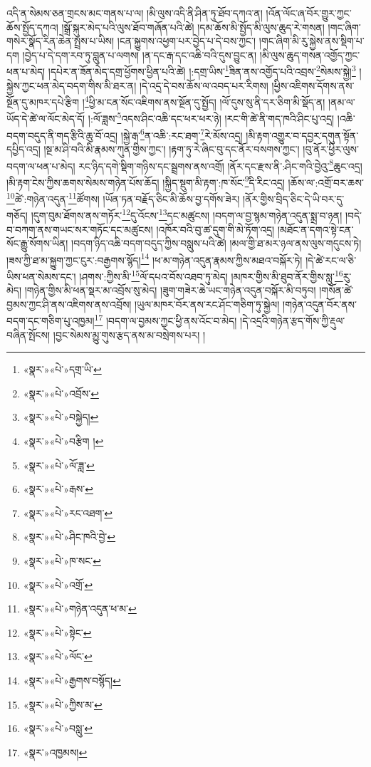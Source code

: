 འདི་ན་སེམས་ཅན་གྲངས་མང་གནས་པ་ལ། །མི་ལུས་འདི་ནི་ཤིན་ཏུ་ཐོབ་དཀའ་ན། །འོན་ལོང་ཞ་བོར་གྱུར་ཀྱང་ཆོས་སྤྱོད་དཀའ། །སྒྲོ་སྐུར་མེད་པའི་ལུས་ཐོབ་གཞོན་པའི་ཚེ། །དམ་ཆོས་མི་སྤྱོད་མི་ལུས་ཆུད་རེ་གསན། །གང་ཞིག་གསེར་སྣོད་རིན་ཆེན་སྤྲས་པ་ཡིས། །ངན་སྐྱུགས་འཕྱག་པར་བྱེད་པ་དེ་བས་ཀྱང་། །གང་ཞིག་མི་རུ་སྐྱེས་ནས་སྡིག་པ་དག །བྱེད་པ་དེ་དག་རབ་ཏུ་བླུན་པ་ལགས། །ན་དང་རྒ་དང་འཆི་བའི་དུས་བྱུང་ན། །མི་ལུས་ཆུད་གསན་འགྱོད་ཀྱང་ཕན་པ་མེད། །དཔེར་ན་ཟོན་མེད་དགྲ་ཕྱོགས་ཕྱིན་པའི་ཚེ། །:དགྲ་ཡིས་\footnote{«སྣར་»«པེ་»དགྲ་ཡི་}ཟིན་ནས་འགྱོད་པའི་འབྲས་\footnote{«སྣར་»«པེ་»འབྲོས་}སེམས་སྐྱེ།\footnote{«སྣར་»«པེ་»བསྐྱེད།} །སྐྱེས་ཀྱང་ཕན་མེད་བདག་གིས་མི་ཐར་ན། །དེ་འདྲ་དེ་བས་ཆོས་ལ་འབད་པར་རིགས། །ཕྱིས་འཇིགས་དོགས་ནས་སྔོན་དུ་མཁར་དཔེ་རྩིག །\footnote{«སྣར་»«པེ་»བརྩིག །}ཕྱི་མ་ངན་སོང་འཇིགས་ནས་སྔོན་དུ་སྤྱོད། །ལོ་དུས་སུ་ནི་དར་ཅིག་མི་སྡོད་ན། །ནམ་ལ་ཡོད་དེ་ཚེ་ལ་ལོང་མེད་དོ། །:ལོ་ཟླས་\footnote{«སྣར་»«པེ་»ལོ་ཟླ་}འདས་ཤིང་འཆི་དང་ཕར་ཕར་ཉེ། །རང་གི་ཚེ་ནི་གད་ཁའི་ཤིང་པུ་འདྲ། །འཆི་བདག་བདུད་ནི་གད་རྩིའི་ཆུ་བོ་འདྲ། །སྐྱེ་རྒ་\footnote{«སྣར་»«པེ་»རྒས་}ན་འཆི་:རང་ཐག་\footnote{«སྣར་»«པེ་»རང་འཐག་}རེ་མོས་འདྲ། །མི་རྟག་འགྱུར་བ་དབྱར་དགུན་སྟོན་དཔྱིད་འདྲ། །སྔ་མ་ཤི་བའི་མི་རྣམས་ཀུན་གྱིས་ཀྱང་། །རྟག་ཏུ་རེ་ཞིང་བུ་དང་ནོར་བསགས་ཀྱང་། །བུ་ནོར་ཕྱིར་ལུས་བདག་ལ་ཕན་པ་མེད། རང་ཉིད་དགེ་སྡིག་གཉིས་དང་སྦྲགས་ནས་འགྲོ། །ནོར་དང་རྫས་ནི་:ཤིང་གའི་བྱེའུ་\footnote{«སྣར་»«པེ་»ཤིང་ཁའི་བྱེ་}ཆུང་འདྲ། །མི་རྟག་ངེས་ཀྱིས་ཆགས་སེམས་གཉེན་པོས་ཆོད། །སྐྱིད་སྡུག་མི་རྟག་:ཁ་སོང་\footnote{«སྣར་»«པེ་»ཁ་སང་}དི་རིང་འདྲ། །ཆོས་ལ་:འགྲོ་བར་ཆས་\footnote{«སྣར་»«པེ་»འགྲོ་}ཚེ་:གཉེན་འདུན་\footnote{«སྣར་»«པེ་»གཉེན་འདུན་ཕ་མ་}ཚོགས། །ཡོན་ཏན་བརྗོད་ཅིང་མི་ཆོས་བྱ་དགོས་ཟེར། །ནོར་གྱིས་བྲིད་ཅིང་དེ་ཡི་བར་དུ་གཅོད། །དུག་བུམ་ཐོགས་ནས་གཏོར་\footnote{«སྣར་»«པེ་»སྟེང་}དུ་འོངས་\footnote{«སྣར་»«པེ་»ལོང་}དང་མཚུངས། །བདག་ལ་བྱ་སྙམ་གཉེན་འདུན་སྨྲ་བ་ཉན། །བདེ་བ་བཀག་ནས་གཡང་སར་གཏོང་དང་མཚུངས། །འཁོར་བའི་བུ་ཚ་དུག་གི་མེ་ཏོག་འདྲ། །མཐོང་ན་དགའ་སྟེ་ངན་སོང་རྒྱུ་སོགས་ཡིན། །བདག་ཉིད་འཆི་བདག་བདུད་ཀྱིས་བསླུས་པའི་ཚེ། །མལ་གྱི་ཐ་མར་ཉལ་ནས་ལུས་གདུངས་ཏེ། །ཟས་ཀྱི་ཐ་མ་སྐྱུག་ཀྱང་ངུར་:བརྒྱགས་སྙོད།\footnote{«སྣར་»«པེ་»རྒྱགས་བསྙོད།} །ཕ་མ་གཉེན་འདུན་རྣམས་ཀྱིས་མཐའ་བསྐོར་ཏེ། །དེ་ཚེ་རང་ལ་ཅི་ཡིས་ཕན་སེམས་དང་། །ཤགས་:ཀྱིས་མི་\footnote{«སྣར་»«པེ་»ཀྱིས་མ་}ལོ་དཔའ་བོས་འཐབ་ཏུ་མེད། །མཁར་གྱིས་མི་ཐུབ་ནོར་གྱིས་སླུ་\footnote{«སྣར་»«པེ་»བསླུ་}རུ་མེད། །གཉེན་གྱིས་མི་ཕན་སྡར་མ་འབྲོས་སུ་མེད། །ཟུག་གཟེར་ཆེ་ཡང་གཉེན་འདུན་བསྐོར་མི་བཏུབ། །གསོན་ཚེ་བྱམས་ཀྱང་ཤི་ནས་འཇིགས་ནས་འབྲོས། །ཡུལ་མཁར་བོར་ནས་རང་ཤོང་གཅིག་ཏུ་སྐྱེལ། །གཉེན་འདུན་བོར་ནས་བདག་དང་གཅིག་པུ་འཁྱམ།\footnote{«སྣར་»འཁྱམས།} །བདག་ལ་བྱམས་ཀྱང་ཕྱི་ནས་འོང་བ་མེད། །དེ་འདྲའི་གཉེན་རྩད་གོས་ཀྱི་རྡུལ་བཞིན་སྤོངས། །བྱང་སེམས་མྱུ་གུས་རྩད་ནས་མ་བསྲེགས་པར། །
